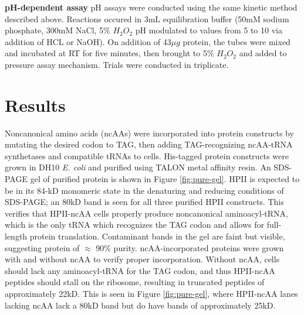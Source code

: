 \documentclass[9pt,twocolumn,twoside]{pnas-new}
\begin{document}
\textbf{pH-dependent assay}
pH assays were conducted using the same kinetic method described above. Reactions occured in 3mL equilibration buffer (50mM sodium phosphate, 300mM NaCl, 5\% $H_2O_2$ pH modulated to values from 5 to 10 via addition of HCL or NaOH). On addition of 43$\mu g$ protein, the tubes were mixed and incubated at RT for five minutes, then brought to 5\% $H_2O_2$ and added to pressure assay mechanism. Trials were conducted in triplicate.\\

\section{Results}
Noncanonical amino acids (ncAAs) were incorporated into protein constructs by mutating the desired codon to TAG, then adding TAG-recognizing ncAA-tRNA synthetases and compatible tRNAs to cells. His-tagged protein constructs were grown in DH10 \textit{E. coli} and purified using TALON metal affinity resin. An SDS-PAGE gel of purified protein is shown in Figure \ref{fig:pure-gel}. HPII is expected to be in its 84-kD monomeric state in the denaturing and reducing conditions of SDS-PAGE; an 80kD band is seen for all three purified HPII constructs. This verifies that HPII-ncAA cells properly produce noncanonical aminoacyl-tRNA, which is the only tRNA which recognizes the TAG codon and allows for full-length protein translation. Contaminant bands in the gel are faint but visible, suggesting protein of $\approx$ 90\% purity. ncAA-incorporated proteins were grown with and without ncAA to verify proper incorporation. Without ncAA, cells should lack any aminoacyl-tRNA for the TAG codon, and thus HPII-ncAA peptides should stall on the ribosome, resulting in truncated peptides of approximately 22kD. This is seen in Figure \ref{fig:pure-gel}, where HPII-ncAA lanes lacking ncAA lack a 80kD band but do have bands of approximately 25kD.\\
\end{document}
